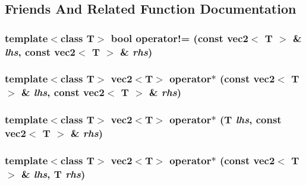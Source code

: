 \subsection{Friends And Related Function Documentation}
\hypertarget{classnv_1_1vec2_996c39a11242ad1431131ab6cf71e383}{
\subsubsection[{operator!=}]{\setlength{\rightskip}{0pt plus 5cm}template$<$class T$>$ bool operator!= (const {\bf vec2}$<$ T $>$ \& {\em lhs}, \/  const {\bf vec2}$<$ T $>$ \& {\em rhs})}}
\label{classnv_1_1vec2_996c39a11242ad1431131ab6cf71e383}


\hypertarget{classnv_1_1vec2_bfa3883153adec88b629071d6214181c}{
\subsubsection[{operator$\ast$}]{\setlength{\rightskip}{0pt plus 5cm}template$<$class T$>$ {\bf vec2}$<$T$>$ operator$\ast$ (const {\bf vec2}$<$ T $>$ \& {\em lhs}, \/  const {\bf vec2}$<$ T $>$ \& {\em rhs})}}
\label{classnv_1_1vec2_bfa3883153adec88b629071d6214181c}


\hypertarget{classnv_1_1vec2_0d9aa669bcd9d0c4217f0be882e95bc6}{
\subsubsection[{operator$\ast$}]{\setlength{\rightskip}{0pt plus 5cm}template$<$class T$>$ {\bf vec2}$<$T$>$ operator$\ast$ (T {\em lhs}, \/  const {\bf vec2}$<$ T $>$ \& {\em rhs})}}
\label{classnv_1_1vec2_0d9aa669bcd9d0c4217f0be882e95bc6}


\hypertarget{classnv_1_1vec2_cf094661268a6716a0838effa711d5fd}{
\subsubsection[{operator$\ast$}]{\setlength{\rightskip}{0pt plus 5cm}template$<$class T$>$ {\bf vec2}$<$T$>$ operator$\ast$ (const {\bf vec2}$<$ T $>$ \& {\em lhs}, \/  T {\em rhs})}}
\label{classnv_1_1vec2_cf094661268a6716a0838effa711d5fd}


